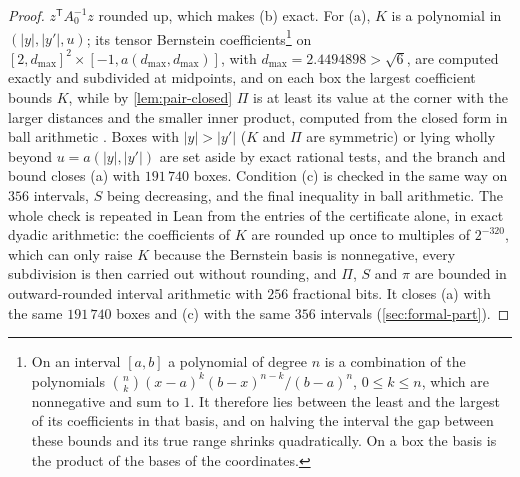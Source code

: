 \documentclass[11pt,reqno]{amsart}
\renewcommand{\_}{\origunderscore\allowbreak}
\numberwithin{equation}{section}
\theoremstyle{plain}
\theoremstyle{definition}
\theoremstyle{remark}
\begin{document}
\begin{proof}
$z^{\mathsf T}A_0^{-1}z$ rounded up, which makes (b) exact. For (a), $K$ is a
polynomial in $(|y|,|y'|,u)$; its tensor Bernstein
coefficients\footnote{On an interval $[a,b]$ a polynomial of degree $n$ is a
  combination of the polynomials
  $\binom nk(x-a)^k(b-x)^{n-k}/(b-a)^n$, $0\le k\le n$, which are
  nonnegative and sum to $1$. It therefore lies between the least and the
  largest of its coefficients in that basis, and on halving the interval the
  gap between these bounds and its true range shrinks quadratically. On a box
  the basis is the product of the bases of the coordinates.} on
$[2,d_{\max}]^2\times[-1,a(d_{\max},d_{\max})]$, with
$d_{\max}=2.4494898>\sqrt6$, are computed exactly and subdivided at
midpoints, and on each box the largest coefficient bounds $K$, while by
\cref{lem:pair-closed} $\Pi$ is at least its value at the corner with the
larger distances and the smaller inner product, computed from the closed form
in ball arithmetic \cite{Joh17}. Boxes with $|y|>|y'|$ ($K$ and $\Pi$ are
symmetric) or lying wholly beyond $u=a(|y|,|y'|)$ are set aside by exact
rational tests, and the branch and bound closes (a) with $191\,740$ boxes.
Condition (c) is checked in the same way on $356$ intervals, $S$ being
decreasing, and the final inequality in ball arithmetic. The whole check is
repeated in Lean from the entries of the certificate alone, in exact dyadic
arithmetic: the coefficients of $K$ are rounded up once to multiples of
$2^{-320}$, which can only raise $K$ because the Bernstein basis is
nonnegative, every subdivision is then carried out without rounding, and
$\Pi$, $S$ and $\pi$ are bounded in outward-rounded interval arithmetic with
$256$ fractional bits. It closes (a) with the same $191\,740$ boxes and (c)
with the same $356$ intervals (\cref{sec:formal-part}).
\end{proof}
\end{document}
